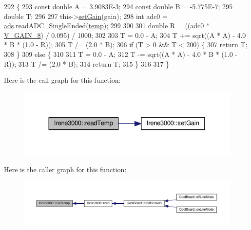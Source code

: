 \begin{DoxyCode}
292 \{
293   \textcolor{keyword}{const} \textcolor{keywordtype}{double} A = 3.9083E-3;
294   \textcolor{keyword}{const} \textcolor{keywordtype}{double} B = -5.775E-7;
295   \textcolor{keywordtype}{double} T;
296   
297   this->\hyperlink{classIrene3000_aff7c5da186b388e7272e63ff88a20c34}{setGain}(gain);
298   \textcolor{keywordtype}{int} adc0 = \hyperlink{classIrene3000_a1215e77ba761c9908d80d691f149e135}{ads}.readADC\_SingleEnded(\hyperlink{Irene3000_8h_a5905d48604152cf57aa6bfa087b49173}{temp});
299  
300 
301   \textcolor{keywordtype}{double} R = ((adc0 * \hyperlink{Irene3000_8h_ab7ab16df599d3f0ce29e12791a504891}{V\_GAIN\_8}) / 0.095) / 1000;
302 
303   T = 0.0 - A;
304   T += sqrt((A * A) - 4.0 * B * (1.0 - R));
305   T /= (2.0 * B);
306   \textcolor{keywordflow}{if} (T > 0 && T < 200) \{
307     \textcolor{keywordflow}{return} T;
308   \}
309   \textcolor{keywordflow}{else} \{
310   
311     T = 0.0 - A;
312     T -= sqrt((A * A) - 4.0 * B * (1.0 - R));
313     T /= (2.0 * B);
314     \textcolor{keywordflow}{return} T;
315   \}
316 
317 \}
\end{DoxyCode}
Here is the call graph for this function\+:
\nopagebreak
\begin{figure}[H]
\begin{center}
\leavevmode
\includegraphics[width=324pt]{classIrene3000_a94ad40f281d83ad1be20bf1edd6fe802_cgraph}
\end{center}
\end{figure}
Here is the caller graph for this function\+:
\nopagebreak
\begin{figure}[H]
\begin{center}
\leavevmode
\includegraphics[width=350pt]{classIrene3000_a94ad40f281d83ad1be20bf1edd6fe802_icgraph}
\end{center}
\end{figure}
\mbox{\label{classIrene3000_a0fba280e8b7c881307efa31281aa691d}} 
